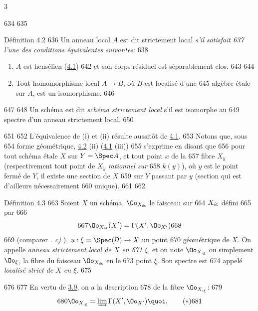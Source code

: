 3	\documentclass[10pt]{../fichiers-configuration-latex/smfart}
\begin{document}
   634	
   635	\begin{enonce*}{Définition 4.2}
   636	Un anneau local $A$ est dit strictement local \emph{s'il satisfait
   637	  l'une des conditions équivalentes suivantes}:
   638	\begin{enumerate}
   639	\renewcommand{\theenumi}{\roman{enumi}}
   640	\renewcommand{\labelenumi}{(\theenumi)}
   641	\item $A$ est hensélien (\hyperref[VIII.subsec4.1]{4.1})
   642	et son corps résiduel est séparablement clos.
   643	
   644	\item Tout homomorphisme local $A \to B$, où $B$ est localisé d'une
   645	  algèbre étale sur $A$, est un isomorphisme.
   646	\end{enumerate}
   647	
   648	Un schéma est dit \emph{schéma strictement local} s'il est isomorphe au
   649	spectre d'un anneau strictement local.
   650	\end{enonce*}
   651	
   652	L'équivalence de (i) et (ii) résulte aussitôt de \hyperref[VIII.subsec4.1]{4.1}.
   653	Notons que, sous
   654	forme géométrique, \hyperref[VIII.def4.2]{4.2} (ii) (\resp \hyperref[VIII.subsec4.1]{4.1} (iii))
   655	s'exprime en disant que
   656	pour tout schéma étale $X$ sur $Y = \Spec A$, et tout point $x$ de la
   657	fibre $X_y$ (respectivement tout point de $X_y$ \emph{rationnel sur}
   658	$k(y)$), où $y$ est le point fermé de $Y$, il existe une section de $X$
   659	sur $Y$ passant par $y$ (section qui est d'ailleurs nécessairement
   660	unique).
   661	
   662	\begin{enonce*}{Définition 4.3}
   663	Soient $X$ un schéma, $\Oo_{X_{\text{\rm ét}}}$ le faisceau sur
   664	$X_{\text{\rm ét}}$ défini
   665	par
   666	$$
   667	\Oo_{X_{\text{\rm ét}}} (X') = \Gamma (X', \Oo_{X'})
   668	$$
   669	(comparer \emph{. c)} ), $u : \xi = \Spec (\Omega) \to X$ un point
   670	géométrique de $X$. On appelle \emph{anneau strictement local de $X$ en
   671	$\xi$}, et on note $\Oo_{{X,}_{\xi}}$ ou simplement	$\Oo_{\xi}$, la fibre du faisceau $\Oo_{X_{\text{\rm ét}}}$ en le
   673	point $\xi$. Son spectre est
   674	appelé \emph{localisé strict de $X$ en $\xi$}.
   675	\end{enonce*}
   676	
   677	En vertu de \hyperref[VIII.prop3.9]{3.9}, on a la description
   678	de la fibre $\Oo_{{X,}_{\xi}}$:
   679	\begin{equation*}
   680	\Oo_{{X,}_{\xi}} = \varinjlim \Gamma (X', \Oo_{X'}){\quoi},\tag{$\ast$}
   681	\end{equation*}
\end{document}
